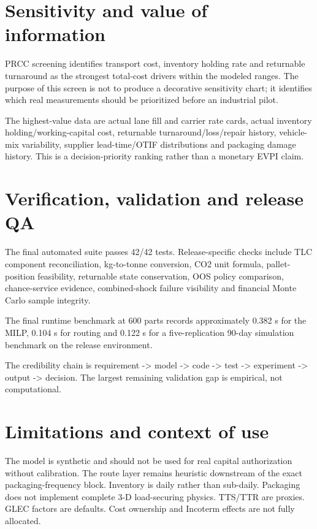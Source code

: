 \documentclass[11pt]{article}
\begin{document}
\section{Sensitivity and value of information}
PRCC screening identifies transport cost, inventory holding rate and returnable turnaround as the strongest total-cost drivers within the modeled ranges. The purpose of this screen is not to produce a decorative sensitivity chart; it identifies which real measurements should be prioritized before an industrial pilot.

The highest-value data are actual lane fill and carrier rate cards, actual inventory holding/working-capital cost, returnable turnaround/loss/repair history, vehicle-mix variability, supplier lead-time/OTIF distributions and packaging damage history. This is a decision-priority ranking rather than a monetary EVPI claim.

\section{Verification, validation and release QA}
The final automated suite passes 42/42 tests. Release-specific checks include TLC component reconciliation, kg-to-tonne conversion, CO2 unit formula, pallet-position feasibility, returnable state conservation, OOS policy comparison, chance-service evidence, combined-shock failure visibility and financial Monte Carlo sample integrity.

The final runtime benchmark at 600 parts records approximately 0.382 s for the MILP, 0.104 s for routing and 0.122 s for a five-replication 90-day simulation benchmark on the release environment.

The credibility chain is requirement -> model -> code -> test -> experiment -> output -> decision. The largest remaining validation gap is empirical, not computational.

\section{Limitations and context of use}
The model is synthetic and should not be used for real capital authorization without calibration. The route layer remains heuristic downstream of the exact packaging-frequency block. Inventory is daily rather than sub-daily. Packaging does not implement complete 3-D load-securing physics. TTS/TTR are proxies. GLEC factors are defaults. Cost ownership and Incoterm effects are not fully allocated.
\end{document}
